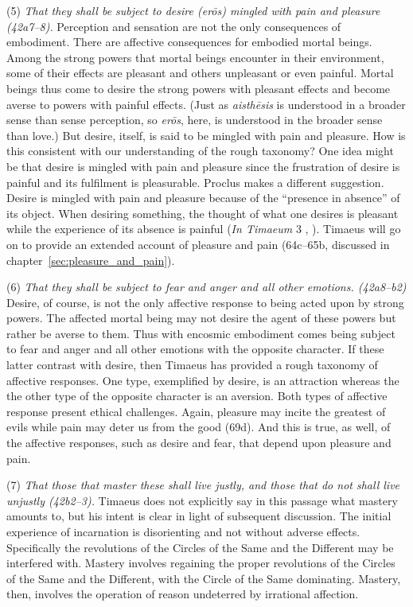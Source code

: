 (5) \emph{That they shall be subject to desire (\emph{erōs}) mingled with pain and pleasure (42a7--8).} Perception and sensation are not the only consequences of embodiment. There are affective consequences for embodied mortal beings.  Among the strong powers that mortal beings encounter in their environment, some of their effects are pleasant and others unpleasant or even painful. Mortal beings thus come to desire the strong powers with pleasant effects and become averse to powers with painful effects. (Just as \emph{aisthēsis} is understood in a broader sense than sense perception, so \emph{erōs}, here, is understood in the broader sense than love.) But desire, itself, is said to be mingled with pain and pleasure. How is this consistent with our understanding of the rough taxonomy? One idea might be that desire is mingled with pain and pleasure since the frustration of desire is painful and its fulfilment is pleasurable. Proclus makes a different suggestion. Desire is mingled with pain and pleasure because of the ``presence in absence'' of its object. When desiring something, the thought of what one desires is pleasant while the experience of its absence is painful (\emph{In Timaeum} 3  , \citealt{Diehl:1903re}). Timaeus will go on to provide an extended account of pleasure and pain (64c--65b, discussed in chapter~\ref{sec:pleasure_and_pain}).

(6) \emph{That they shall be subject to fear and anger and all other emotions. (42a8--b2)} Desire, of course, is not the only affective response to being acted upon by strong powers. The affected mortal being may not desire the agent of these powers but rather be averse to them. Thus with encosmic embodiment comes being subject to fear and anger and all other emotions with the opposite character. If these latter contrast with desire, then Timaeus has provided a rough taxonomy of affective responses. One type, exemplified by desire, is an attraction whereas the the other type of the opposite character is an aversion. Both types of affective response present ethical challenges. Again, pleasure may incite the greatest of evils while pain may deter us from the good (69d). And this is true, as well, of the affective responses, such as desire and fear, that depend upon pleasure and pain.

(7) \emph{That those that master these shall live justly, and those that do not shall live unjustly (42b2--3).} Timaeus does not explicitly say in this passage what mastery amounts to, but his intent is clear in light of subsequent discussion. The initial experience of incarnation is disorienting and not without adverse effects. Specifically the revolutions of the Circles of the Same and the Different may be interfered with. Mastery involves regaining the proper revolutions of the Circles of the Same and the Different, with the Circle of the Same dominating. Mastery, then, involves the operation of reason undeterred by irrational affection.


